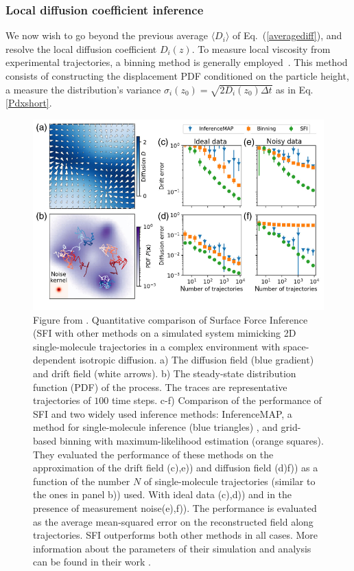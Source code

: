 \subsubsection{Local diffusion coefficient inference}

We now wish to go beyond the previous average $\langle D_i\rangle$ of Eq.~(\ref{averagediff}), and resolve the local diffusion coefficient $D_i(z)$. To measure local viscosity from experimental trajectories, a binning method is generally employed~\cite{friedrich_approaching_2011}. This method consists of constructing the displacement \gls{PDF} conditioned on the particle height, a measure the distribution's variance $\sigma_i(z_0) = \sqrt{2D_i (z_0) \Delta t}$ as in Eq.\ref{Pdxshort}. 


\begin{figure}[h!]
	\centering
	\includegraphics[scale=0.6]{02_body/chapter3/images/diffusion_coefficient/figure_Ronceray.png}
	\caption{Figure from \cite{frishman_learning_2020}. Quantitative comparison of Surface Force Inference (\gls{SFI} with other methods on a simulated system mimicking 2D single-molecule trajectories in a complex environment with space-dependent isotropic diffusion. a) The diffusion field (blue gradient) and drift field (white arrows). b) The steady-state distribution function (\gls{PDF}) of the process. The traces are representative trajectories of $100$ time steps. c-f) Comparison of the performance of \gls{SFI} and two widely used inference methods: InferenceMAP, a method for single-molecule inference (blue triangles)  \cite{beheiry_inferencemap_2015}, and grid-based binning with maximum-likelihood estimation \cite{hoze_heterogeneity_2012, friedrich_approaching_2011} (orange squares). They evaluated the performance of these methods on the approximation of the drift field (c),e)) and diffusion field (d)f)) as a function of the number $N$ of single-molecule trajectories (similar to the ones in panel b)) used. With ideal data (c),d)) and in the presence of measurement noise(e),f)). The performance is evaluated as the average mean-squared error on the reconstructed field along trajectories. \gls{SFI} outperforms both other methods in all cases. More information about the parameters of their simulation and analysis can be found in their work \cite{frishman_learning_2020}.}
	\label{fig.ronceray}
\end{figure}

